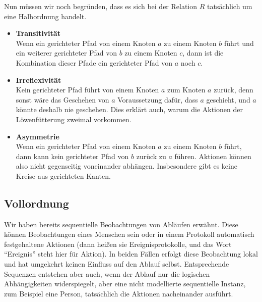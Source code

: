 \vspace{1em} %

Nun müssen wir noch begründen, dass es sich bei der Relation $R$ tatsächlich um eine Halbordnung handelt.

\begin{itemize}
	\setlength{\itemsep}{2mm} %
	
	\item \textbf{Transitivität}\\
	Wenn ein gerichteter Pfad von einem Knoten $a$ zu einem Knoten $b$ führt und ein weiterer gerichteter Pfad von $b$ zu einem Knoten $c$, dann ist die Kombination dieser Pfade ein gerichteter Pfad von $a$ noch $c$.
	
	\item \textbf{Irreflexivität}\\
	Kein gerichteter Pfad führt von einem Knoten $a$ zum Knoten $a$ zurück, denn sonst wäre das Geschehen von $a$ Voraussetzung dafür, dass $a$ geschieht, und $a$ könnte deshalb nie geschehen. Dies erklärt auch, warum die Aktionen der Löwenfütterung zweimal vorkommen. 
	
	\item \textbf{Asymmetrie}\\
	Wenn ein gerichteter Pfad von einem Knoten $a$ zu einem Knoten $b$ führt, dann kann kein gerichteter Pfad von $b$ zurück zu $a$ führen. Aktionen können also nicht gegenseitig voneinander abhängen. Insbesondere gibt es keine Kreise aus gerichteten Kanten.
\end{itemize}

\pagebreak

\subsection*{Vollordnung}

Wir haben bereits sequentielle Beobachtungen von Abläufen erwähnt. 
Diese können Beobachtungen eines Menschen sein oder in einem Protokoll automatisch festgehaltene Aktionen (dann heißen sie Ereignisprotokolle, und das Wort "`Ereignis"' steht hier für Aktion). In beiden Fällen erfolgt diese Beobachtung lokal und hat umgekehrt keinen Einfluss auf den Ablauf selbst. Entsprechende Sequenzen entstehen aber auch, wenn der Ablauf nur die logischen Abhängigkeiten widerspiegelt, aber eine nicht modellierte sequentielle Instanz, zum Beispiel eine Person, tatsächlich die Aktionen nacheinander ausführt.

